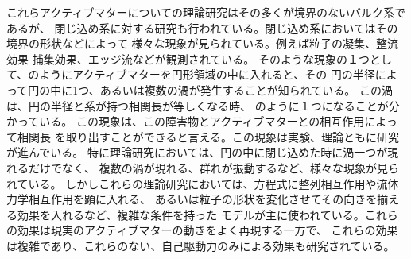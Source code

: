 \documentclass[/Users/ikedahajime/GitHub/reserch/master_report/thesis]{subfiles}
\begin{document}
これらアクティブマターについての理論研究はその多くが境界のないバルク系であるが、
閉じ込め系に対する研究も行われている。閉じ込め系においてはその境界の形状などによって%
様々な現象が見られている。例えば粒子の凝集\cite{dasAggregateMorphologyActive2020}、整流効果\cite{ghoshSelfPropelledJanusParticles2013}
捕集効果\cite{kaiserHowCaptureActive2012}、エッジ流\cite{soniOddFreeSurface2019}などが観測されている。
そのような現象の１つとして、のようにアクティブマターを円形領域の中に入れると、その
円の半径によって円の中に1つ、あるいは複数の渦が発生することが知られている。
この渦は、円の半径と系が持つ相関長が等しくなる時、
のように１つになることが分かっている。
この現象は、この障害物とアクティブマターとの相互作用によって相関長
を取り出すことができると言える。この現象は実験、理論ともに研究が進んでいる。
特に理論研究においては、円の中に閉じ込めた時に渦一つが現れるだけでなく、
複数の渦が現れる、群れが振動するなど、様々な現象が見られている。
しかしこれらの理論研究においては、方程式に整列相互作用や流体力学相互作用を顕に入れる、
あるいは粒子の形状を変化させてその向きを揃える効果を入れるなど、複雑な条件を持った
モデルが主に使われている。これらの効果は現実のアクティブマターの動きをよく再現する一方で、
これらの効果は複雑であり、これらのない、自己駆動力のみによる効果も研究されている。
\end{document}
